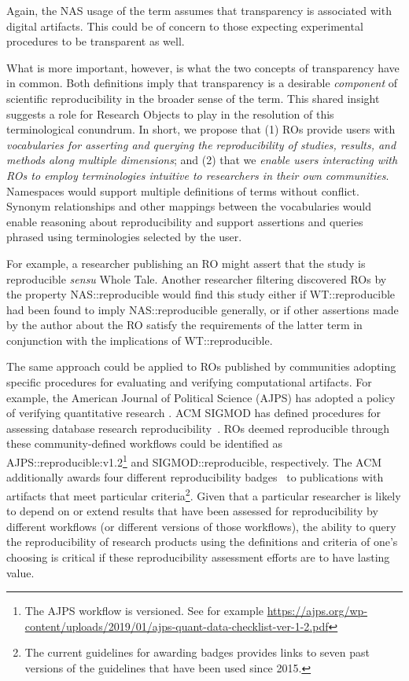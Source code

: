 \noindent Again, the NAS usage of the term assumes that transparency is associated with digital artifacts.
This could be of concern to those expecting experimental procedures to be transparent as well.

What is more important, however, is what the two concepts of transparency have in common.
Both definitions imply that transparency is a desirable \emph{component} of scientific
    reproducibility in the broader sense of the term.
This shared insight suggests a role for Research Objects to play in the resolution of this
    terminological conundrum.
In short, we propose that (1) ROs provide users with \emph{vocabularies for asserting and
    querying the reproducibility of studies, results, and methods along multiple dimensions};
    and (2) that we \emph{enable users interacting with ROs to employ terminologies intuitive to
    researchers in their own communities}.
Namespaces would support multiple definitions of terms without conflict.
Synonym relationships and other mappings between the vocabularies would enable reasoning about
    reproducibility and support assertions and queries phrased using terminologies selected by
    the user.

For example, a researcher publishing an RO might assert that the study is reproducible \emph{sensu}
    \textsf{Whole Tale}.
Another researcher filtering discovered ROs by the property \textsf{NAS::reproducible} would
    find this study either if \textsf{WT::reproducible} had been found to imply
    \textsf{NAS::reproducible} generally, or if other assertions made by the author
    about the RO satisfy the requirements of the latter term in conjunction with the
    implications of \textsf{WT::reproducible}.

The same approach could be applied to ROs published by communities adopting specific
    procedures for evaluating and verifying computational artifacts.
For example, the American Journal of Political Science (AJPS) has adopted a policy of
    verifying quantitative research \cite{christian2018}.
ACM SIGMOD has defined procedures for assessing database research
    reproducibility~\cite{bonnet_repeatability_2011, sigmod2018reproducibility}.
ROs deemed reproducible through these community-defined workflows could be
    identified as \textsf{AJPS::reproducible:v1.2}\footnote{
        The AJPS workflow is versioned. See for example
        \url{https://ajps.org/wp-content/uploads/2019/01/ajps-quant-data-checklist-ver-1-2.pdf}
    } and \textsf{SIGMOD::reproducible}, respectively.
The ACM additionally awards four different reproducibility badges~\cite{acm2019badging} to publications
    with artifacts that meet particular criteria\footnote{The current guidelines for awarding
    badges provides links to seven past versions of the guidelines that have been used since 2015.}.
Given that a particular researcher is likely to depend on or extend results that have been
    assessed for reproducibility by different workflows (or different versions of those
    workflows), the ability to query the reproducibility of research products using the definitions and
    criteria of one's choosing is critical if these reproducibility assessment efforts
    are to have lasting value.


